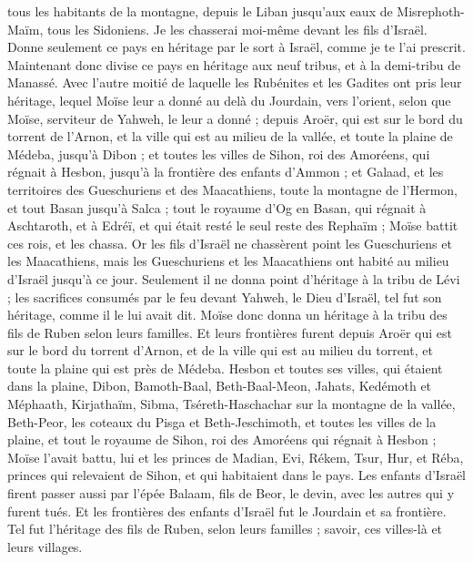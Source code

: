 \begin{multicols}{2}
tous les habitants de la montagne, depuis le Liban jusqu'aux eaux de Misrephoth-Maïm, tous les Sidoniens. Je les chasserai moi-même devant les fils d'Israël. Donne seulement ce pays en héritage par le sort à Israël, comme je te l'ai prescrit.
Maintenant donc divise ce pays en héritage aux neuf tribus, et à la demi-tribu de Manassé.
Avec l'autre moitié de laquelle les Rubénites et les Gadites ont pris leur héritage, lequel Moïse leur a donné au delà du Jourdain, vers l'orient, selon que Moïse, serviteur de Yahweh, le leur a donné ;
depuis Aroër, qui est sur le bord du torrent de l'Arnon, et la ville qui est au milieu de la vallée, et toute la plaine de Médeba, jusqu'à Dibon ;
et toutes les villes de Sihon, roi des Amoréens, qui régnait à Hesbon, jusqu'à la frontière des enfants d'Ammon ;
et Galaad, et les territoires des Gueschuriens et des Maacathiens, toute la montagne de l'Hermon, et tout Basan jusqu'à Salca ;
tout le royaume d'Og en Basan, qui régnait à Aschtaroth, et à Edréï, et qui était resté le seul reste des Rephaïm ; Moïse battit ces rois, et les chassa.
Or les fils d'Israël ne chassèrent point les Gueschuriens et les Maacathiens, mais les Gueschuriens et les Maacathiens ont habité au milieu d'Israël jusqu'à ce jour.
Seulement il ne donna point d'héritage à la tribu de Lévi ; les sacrifices consumés par le feu devant Yahweh, le Dieu d'Israël, tel fut son héritage, comme il le lui avait dit.
Moïse donc donna un héritage à la tribu des fils de Ruben selon leurs familles.
Et leurs frontières furent depuis Aroër qui est sur le bord du torrent d'Arnon, et de la ville qui est au milieu du torrent, et toute la plaine qui est près de Médeba.
Hesbon et toutes ses villes, qui étaient dans la plaine, Dibon, Bamoth-Baal, Beth-Baal-Meon,
Jahats, Kedémoth et Méphaath,
Kirjathaïm, Sibma, Tséreth-Haschachar sur la montagne de la vallée,
Beth-Peor, les coteaux du Pisga et Beth-Jeschimoth,
et toutes les villes de la plaine, et tout le royaume de Sihon, roi des Amoréens qui régnait à Hesbon ; Moïse l'avait battu, lui et les princes de Madian, Evi, Rékem, Tsur, Hur, et Réba, princes qui relevaient de Sihon, et qui habitaient dans le pays.
Les enfants d'Israël firent passer aussi par l'épée Balaam, fils de Beor, le devin, avec les autres qui y furent tués.
Et les frontières des enfants d'Israël fut le Jourdain et sa frontière. Tel fut l'héritage des fils de Ruben, selon leurs familles ; savoir, ces villes-là et leurs villages.

\end{multicols}
